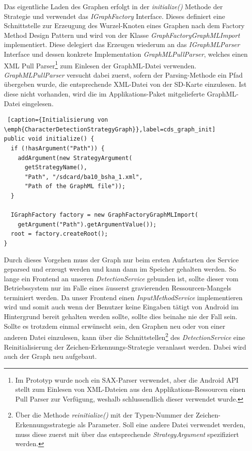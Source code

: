Das eigentliche Laden des Graphen erfolgt in der \emph{initialize()} Methode der Strategie und verwendet das \emph{IGraphFactory} Interface. Dieses definiert eine Schnittstelle zur Erzeugung des Wurzel-Knoten eines Graphen nach dem Factory Method Design Pattern\cite[S.107-116]{designpatterns} und wird von der Klasse \emph{GraphFactoryGraphMLImport} implementiert. Diese delegiert das Erzeugen wiederum an das \emph{IGraphMLParser} Interface und dessen konkrete Implementation \emph{GraphMLPullParser}, welches einen XML Pull Parser\footnote{Im Prototyp wurde noch ein SAX-Parser verwendet, aber die Android API stellt zum Einlesen von XML-Dateien aus den Applikations-Ressourcen einen Pull Parser zur Verfügung, weshalb schlussendlich dieser verwendet wurde.} zum Einlesen der GraphML-Datei verwenden. \emph{GraphMLPullParser} versucht dabei zuerst, sofern der Parsing-Methode ein Pfad übergeben wurde, die entsprechende XML-Datei von der SD-Karte einzulesen. Ist diese nicht vorhanden, wird die im Applikations-Paket mitgelieferte GraphML-Datei eingelesen.

\begin{lstlisting} [caption={Initialisierung von \emph{CharacterDetectionStrategyGraph}},label=cds_graph_init]
public void initialize() {
  if (!hasArgument("Path")) {
    addArgument(new StrategyArgument(
      getStrategyName(), 
      "Path", "/sdcard/ba10_bsha_1.xml", 
      "Path of the GraphML file"));
  }

  IGraphFactory factory = new GraphFactoryGraphMLImport(
    getArgument("Path").getArgumentValue());
  root = factory.createRoot();	
}
\end{lstlisting}

Durch dieses Vorgehen muss der Graph nur beim ersten Aufstarten des Service geparsed und erzeugt werden und kann dann im Speicher gehalten werden. So lange ein Frontend an unseren \emph{DetectionService} gebunden ist, sollte dieser vom Betriebssystem nur im Falle eines äusserst gravierenden Ressourcen-Mangels terminiert werden. Da unser Frontend einen \emph{InputMethodService} implementieren wird und somit auch wenn der Benutzer keine Eingaben tätigt von Android im Hintergrund bereit gehalten werden sollte, sollte dies beinahe nie der Fall sein. Sollte es trotzdem einmal erwünscht sein, den Graphen neu oder von einer anderen Datei einzulesen, kann über die Schnittstellen\footnote{Über die Methode \emph{reinitialize()} mit der Typen-Nummer der Zeichen-Erkennungsstrategie als Parameter. Soll eine andere Datei verwendet werden, muss diese zuerst mit über das entsprechende \emph{StrategyArgument} spezifiziert werden.} des \emph{DetectionService} eine Reinitialisierung der Zeichen-Erkennungs-Strategie veranlasst werden. Dabei wird auch der Graph neu aufgebaut.

